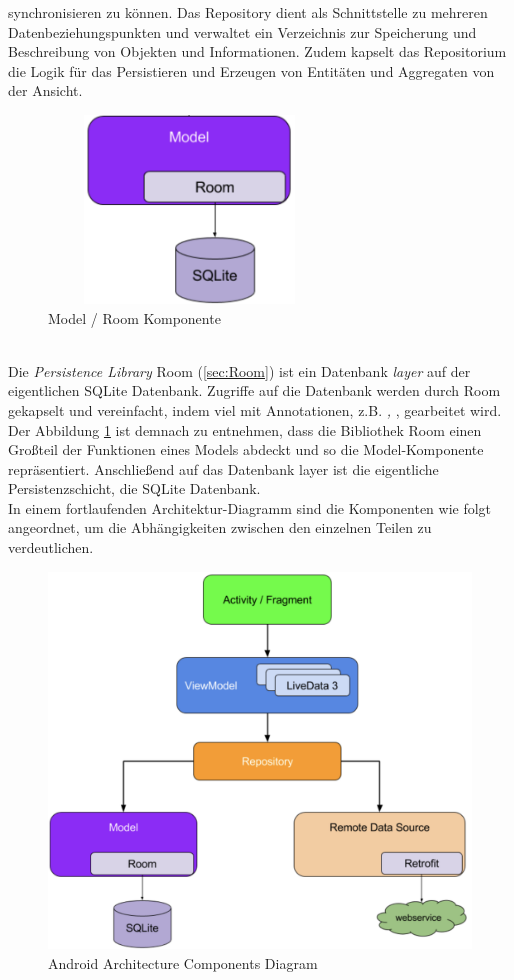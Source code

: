 synchronisieren zu können. Das Repository dient als Schnittstelle zu mehreren Datenbeziehungspunkten und verwaltet ein Verzeichnis zur 
Speicherung und Beschreibung von Objekten und Informationen. Zudem kapselt das Repositorium die Logik für das Persistieren und Erzeugen von 
Entitäten und Aggregaten von der Ansicht. 
\begin{figure}[hbt!]
    \centering
    \includegraphics[width=7.5cm,height=5cm,keepaspectratio]{2GrundlagenX/Bilder/roomComp.png}
    \caption{Model / Room Komponente \cite{aac.2020j}}
    \label{pic:roomComp}
\end{figure} 
\\ 
Die \textit{Persistence Library} Room (\ref{sec:Room}) ist ein Datenbank \textit{layer} auf der eigentlichen SQLite Datenbank. Zugriffe auf 
die Datenbank werden durch Room gekapselt und vereinfacht, indem viel mit Annotationen, z.B. \textit{\@Entity, \@Dao}, gearbeitet wird. Der 
Abbildung \ref{pic:roomComp} ist demnach zu entnehmen, dass die Bibliothek Room einen Großteil der Funktionen eines Models abdeckt und so 
die Model-Komponente repräsentiert. Anschließend auf das Datenbank layer ist die eigentliche Persistenzschicht, die SQLite Datenbank.
\\ 
\linebreak 
In einem fortlaufenden Architektur-Diagramm sind die Komponenten wie folgt angeordnet, um die Abhängigkeiten zwischen den einzelnen Teilen 
zu verdeutlichen. 
\begin{figure}[hbt!]
    \centering
    \includegraphics[width=15cm,height=10cm,keepaspectratio]{2GrundlagenX/Bilder/aac.png}
    \caption{Android Architecture Components Diagram\cite{aac.2020j}}
    \label{pic:aacDia}
\end{figure} 
